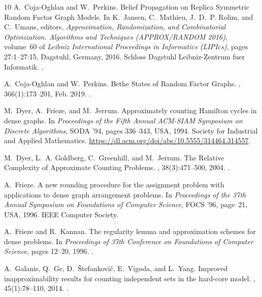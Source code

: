 \documentclass[11pt,letterpaper]{amsart}
\theoremstyle{definition}
\begin{document}
\begin{thebibliography}{10}
A.~{Coja-Oghlan} and W.~Perkins.
\newblock Belief {{Propagation}} on {{Replica Symmetric Random Factor Graph
  Models}}.
\newblock In K.~Jansen, C.~Mathieu, J.~D.~P. Rolim, and C.~Umans, editors, {\em
  Approximation, {{Randomization}}, and {{Combinatorial Optimization}}.
  {{Algorithms}} and {{Techniques}} ({{APPROX}}/{{RANDOM}} 2016)}, volume~60 of
  {\em Leibniz {{International Proceedings}} in {{Informatics}} ({{LIPIcs}})},
  pages 27:1--27:15, {Dagstuhl, Germany}, 2016. {Schloss Dagstuhl\textendash
  Leibniz-Zentrum fuer Informatik}.
\newblock {}.

A.~{Coja-Oghlan} and W.~Perkins.
\newblock Bethe {{States}} of {{Random Factor Graphs}}.
, 366(1):173--201, Feb.
  2019.
\newblock {}.

M.~Dyer, A.~Frieze, and M.~Jerrum.
\newblock Approximately counting {{Hamilton}} cycles in dense graphs.
\newblock In {\em Proceedings of the Fifth Annual {{ACM-SIAM}} Symposium on
  {{Discrete}} Algorithms}, {{SODA}} '94, pages 336--343, {USA}, 1994. {Society
  for Industrial and Applied Mathematics}.
\newblock \urlprefix\url{https://dl.acm.org/doi/abs/10.5555/314464.314557}.

M.~Dyer, L.~A. Goldberg, C.~Greenhill, and M.~Jerrum.
\newblock The {{Relative Complexity}} of {{Approximate Counting Problems}}.
, 38(3):471--500, 2004.
\newblock {}.

A.~Frieze.
\newblock A new rounding procedure for the assignment problem with applications
  to dense graph arrangement problems.
\newblock In {\em Proceedings of the 37th {{Annual Symposium}} on
  {{Foundations}} of {{Computer Science}}}, {{FOCS}} '96, page~21, {USA}, 1996.
  {IEEE Computer Society}.

A.~Frieze and R.~Kannan.
\newblock The regularity lemma and approximation schemes for dense problems.
\newblock In {\em Proceedings of 37th {{Conference}} on {{Foundations}} of
  {{Computer Science}}}, pages 12--20, 1996.
\newblock {}.

A.~Galanis, Q.~Ge, D.~{\v S}tefankovi{\v c}, E.~Vigoda, and L.~Yang.
\newblock Improved inapproximability results for counting independent sets in
  the hard-core model.
, 45(1):78--110, 2014.
\newblock {}.


\end{thebibliography}
\end{document}
